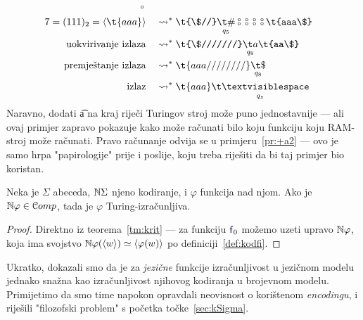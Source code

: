 \begin{primjer}
\begin{align}
\begin{array}{@{}c@{}}
    \text\textopenbullet
    \end{array}\\
7=(111)_2=\kr{\t{aaa}}&&{}\leadsto^*{}&
\renewcommand{\arraystretch}{0.1}
 \t{\$//}\underset{\mathclap{q_5}}{\t\#}\begin{array}{@{}c@{}}
    \text\textopenbullet\\
    \text\textopenbullet
    \end{array}\begin{array}{@{}c@{}}
    \text\textopenbullet\\
    \text\textopenbullet
    \end{array}\begin{array}{@{}c@{}}
    \text\textopenbullet\\
    \text\textopenbullet
    \end{array}\begin{array}{@{}c@{}}
    \text\textopenbullet\\
    \text\textopenbullet
    \end{array}\t{aaa\$}\\
\text{uokvirivanje izlaza}&&{}\leadsto^*{}&
\t{\$///////}\underset{\mathclap{q_8}}{\t a}\t{aa\$}\\
\text{premještanje izlaza}&&{}\leadsto^*{}&
\t{aaa////////}\underset{\mathclap{q_8}}{\t\$}\\
\text{izlaz}&&{}\leadsto^*{}&
\t{aaa}\underset{\mathclap{q_z}}{\bl}
\end{align}
Naravno, dodati \t a na kraj riječi Turingov stroj može puno jednostavnije --- ali ovaj primjer zapravo pokazuje kako može računati bilo koju funkciju koju RAM-stroj može računati. Pravo računanje odvija se u primjeru~\ref{pr:+a2} --- ovo je samo hrpa "papirologije" prije i poslije, koju treba riješiti da bi taj primjer bio koristan.
\end{primjer}

\begin{korolar}\label{kor:krit}
Neka je $\Sigma$ abeceda, ${\mathbb N}\Sigma$ njeno kodiranje, i $\varphi$ funkcija nad njom. Ako je ${\mathbb N}\varphi\in\mathcal Comp$, tada je $\varphi$ Turing-izračunljiva.
\end{korolar}
\begin{proof}
Direktno iz teorema~\ref{tm:krit} --- za funkciju $\f f_0$ možemo uzeti upravo ${\mathbb N}\varphi$, koja ima svojstvo ${\mathbb N}\varphi(\langle w\rangle)\simeq\langle\varphi(w)\rangle$ po definiciji~\ref{def:kodfi}.
\end{proof}

Ukratko, dokazali smo da je za \emph{jezične} funkcije izračunljivost u jezičnom modelu jednako snažna kao izračunljivost njihovog kodiranja u brojevnom modelu. Primijetimo da smo time napokon opravdali neovisnost o korištenom \emph{encodingu}, i riješili "filozofski problem" s početka točke~\ref{sec:kSigma}.

